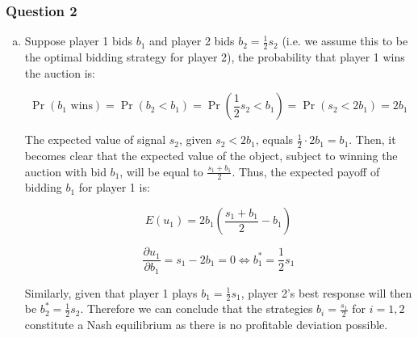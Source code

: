 \documentclass[a4paper]{article}
\begin{document}
\subsubsection{Question 2}
\begin{enumerate}[(a)]
\item
Suppose player 1 bids \(b_{1}\) and player 2 bids
\(b_{2} = \frac{1}{2}s_{2}\) (i.e. we assume this to be the optimal
bidding strategy for player 2), the probability that player 1 wins the
auction is:

\[\Pr\left( b_{1}\text{\ wins} \right) = \Pr\left( b_{2} < b_{1} \right) = \Pr\left( \frac{1}{2}s_{2} < b_{1} \right) = \Pr\left( s_{2} < 2b_{1} \right) = 2b_{1}\]


The expected value of signal \(s_{2}\), given \(s_{2} < 2b_{1}\), equals
\(\frac{1}{2} \cdot 2b_{1} = b_{1}\). Then, it becomes clear that the
expected value of the object, subject to winning the auction with bid
\(b_{1}\), will be equal to \(\frac{s_{1} + b_{1}}{2}\). Thus, the
expected payoff of bidding \(b_{1}\) for player 1 is:


\[E\left( u_{1} \right) = 2b_{1}\left( \frac{s_{1} + b_{1}}{2}-b_1\right)\]

\[ \frac{\partial u_1}{\partial b_1} = s_{1} - 2b_{1} = 0 \iff b_{1}^{*} = \frac{1}{2}s_{1}\]

Similarly, given that player 1 plays \(b_{1} = \frac{1}{2}s_{1}\),
player 2's best response will then be
\(b_{2}^{*} = \frac{1}{2}s_{2}\).
Therefore we can conclude that the strategies
\(b_{i} = \frac{s_{1}}{2}\) for \(i = 1,2\) constitute a Nash
equilibrium as there is no profitable deviation possible.


\end{enumerate}
\end{document}
